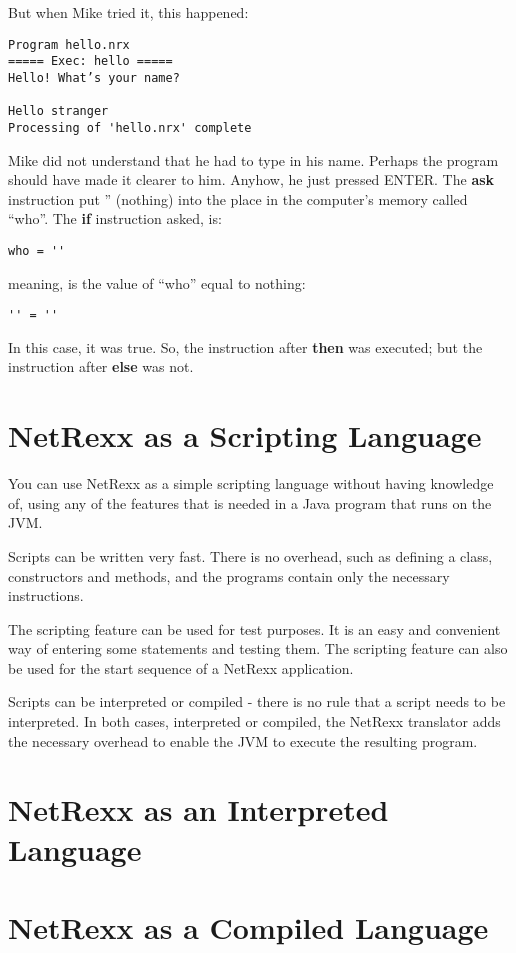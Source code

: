 \documentclass[10pt]{book}
\begin{document}
But when Mike tried it, this happened:
\begin{verbatim}
Program hello.nrx
===== Exec: hello =====
Hello! What’s your name?

Hello stranger
Processing of 'hello.nrx' complete
\end{verbatim}
Mike did not understand that he had to type in his name. Perhaps the
program should have made it clearer to him. Anyhow, he just pressed
ENTER. The \textbf{ask} instruction put '' (nothing) into the place in the
computer's memory called ``who''. The \textbf{if} instruction asked, is:
\begin{verbatim}
who = ''
\end{verbatim}
meaning, is the value of ``who'' equal to nothing:
\begin{verbatim}
'' = ''
\end{verbatim}
 
In this case, it was true. So, the instruction after \textbf{then} was executed; but the instruction after \textbf{else} was not.

\chapter{NetRexx as a Scripting Language}
You can use NetRexx as a simple scripting language without having
knowledge of, using any of the features that is needed in a Java
program that runs on the JVM. 

Scripts can be written very fast. There is
no overhead, such as defining a class, constructors and methods, and the programs contain only
the necessary instructions.

The scripting feature can be used for test purposes. It is an easy and convenient way of entering some statements and testing them.
The scripting feature can also be used for the start sequence of a
NetRexx application.

Scripts can be interpreted or compiled - there is no rule that a
script needs to be interpreted. In both cases, interpreted or
compiled, the NetRexx translator adds the necessary overhead to enable
the JVM to execute the resulting program.

\chapter{NetRexx as an Interpreted Language}

\chapter{NetRexx as a Compiled Language}
\end{document}
